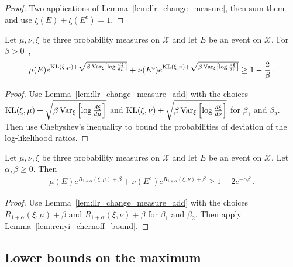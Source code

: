 \begin{proof}\leanok
{}
Two applications of Lemma~\ref{lem:llr_change_measure}, then sum them and use $\xi(E)+\xi(E^c) = 1$.
\end{proof}

\begin{lemma}
  \label{lem:change_measure_variance_add}
  \uses{}
  Let $\mu, \nu, \xi$ be three probability measures on $\mathcal X$ and let $E$ be an event on $\mathcal X$. For $\beta > 0$~,
  \begin{align*}
  \mu(E) e^{\operatorname{KL}(\xi, \mu) + \sqrt{\beta \operatorname{Var}_{\xi}\left[\log\frac{d\xi}{d\mu}\right]}} + \nu(E^c) e^{\operatorname{KL}(\xi, \nu) + \sqrt{\beta \operatorname{Var}_{\xi}\left[\log\frac{d\xi}{d\nu}\right]}}
  \ge 1 - \frac{2}{\beta} \: .
  \end{align*}
\end{lemma}

\begin{proof} %
{}
Use Lemma~\ref{lem:llr_change_measure_add} with the choices $\operatorname{KL}(\xi, \mu) + \sqrt{\beta \operatorname{Var}_{\xi}\left[\log\frac{d\xi}{d\mu}\right]}$ and $\operatorname{KL}(\xi, \nu) + \sqrt{\beta \operatorname{Var}_{\xi}\left[\log\frac{d\xi}{d\nu}\right]}$ for $\beta_1$ and $\beta_2$.
Then use Chebyshev's inequality to bound the probabilities of deviation of the log-likelihood ratios.
\end{proof}

\begin{lemma}
  \label{lem:renyi_change_measure_add}
  \leanok
  Let $\mu, \nu, \xi$ be three probability measures on $\mathcal X$ and let $E$ be an event on $\mathcal X$. Let $\alpha, \beta \ge 0$. Then
  \begin{align*}
  \mu(E) e^{R_{1+\alpha}(\xi, \mu) + \beta} + \nu(E^c) e^{R_{1+\alpha}(\xi, \nu) + \beta} \ge 1 - 2 e^{-\alpha \beta} \: .
  \end{align*}
\end{lemma}

\begin{proof}\leanok
{}
Use Lemma~\ref{lem:llr_change_measure_add} with the choices $R_{1+\alpha}(\xi, \mu) + \beta$ and $R_{1+\alpha}(\xi, \nu) + \beta$ for $\beta_1$ and $\beta_2$.
Then apply Lemma~\ref{lem:renyi_chernoff_bound}.
\end{proof}


\subsection{Lower bounds on the maximum}

